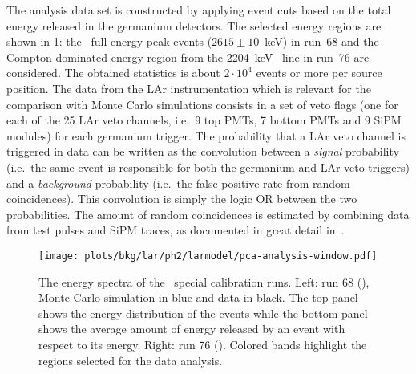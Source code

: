 The analysis data set is constructed by applying event cuts based on the total energy
released in the germanium detectors. The selected energy regions are shown in
\cref{fig:bkg:lar:ph2:pcalib-data}: the \Tl\ full-energy peak events ($2615 \pm 10$~keV)
in run~68 and the Compton-dominated energy region from the 2204~keV \Bih\ line in run~76
are considered. The obtained statistics is about $2 \cdot 10^4$ events or more per
source position.  The data from the LAr instrumentation which is relevant for the
comparison with Monte Carlo simulations consists in a set of veto flags (one for each
of the 25 LAr veto channels, i.e.~9 top PMTs, 7 bottom PMTs and 9 SiPM modules) for each
germanium trigger.  The probability that a LAr veto channel is triggered in data can be
written as the convolution between a \emph{signal} probability (i.e.~the same event is responsible
for both the germanium and LAr veto triggers) and a \emph{background} probability (i.e.~the
false-positive rate from random coincidences). This convolution is simply the logic OR
between the two probabilities. The amount of random coincidences is estimated by combining
data from test pulses and SiPM traces, as documented in great detail
in~\cite{Wiesinger2021}.

\begin{figure}
  \centering
  \texttt{[image: plots/bkg/lar/ph2/larmodel/pca-analysis-window.pdf]}
  \caption{%
    The energy spectra of the \phasetwo\ special calibration runs. Left: run 68 (\Th),
    Monte Carlo simulation in blue and data in black. The top panel shows the energy
    distribution of the events while the bottom panel shows the average amount of
    energy released by an event with respect to its energy. Right: run 76 (\Ra). Colored
    bands highlight the regions selected for the data analysis.
  }\label{fig:bkg:lar:ph2:pcalib-data}
\end{figure}

